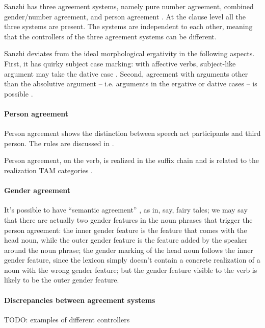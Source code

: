 \documentclass[a4paper, oneside, 12pt]{report}
\newcommand*{\citesec}[1]{\S~{#1}}
\newcommand*{\citetable}[1]{Table~{#1}}
\newcommand*{\citepage}[1]{p.~{#1}}
\begin{document}
Sanzhi has three agreement systems, 
namely pure number agreement, 
combined gender/number agreement, 
and person agreement \citep[\citepage{373}]{forker2020grammar}.
At the clause level all the three systems are present.
The systems are independent to each other, 
meaning that the controllers of the three agreement systems can be different.


Sanzhi deviates from the ideal morphological ergativity
in the following aspects.
First, it has quirky subject case marking: 
with affective verbs, subject-like argument may take the dative case 
\citep[\citetable{19.1}]{forker2020grammar}.
Second, agreement with arguments other than the absolutive argument
-- i.e. arguments in the ergative or dative cases --
is possible \citep[\citesec{20.2.4}]{forker2020grammar}.

\paragraph*{Person agreement}
Person agreement shows the distinction between speech act participants and third person.
The rules are discussed in \citep[\citesec{20.3.2}]{forker2020grammar}.

Person agreement, on the verb, is realized in the suffix chain
and is related to the realization TAM categories 
\citep[\citesec{11.4}]{forker2020grammar}.

\paragraph*{Gender agreement}

It's possible to have ``semantic agreement''
\citep[\citesec{20.2.2}]{forker2020grammar},
as in, say, fairy tales; 
we may say that there are actually two gender features in the 
noun phrases that trigger the person agreement:
the inner gender feature is the feature that comes with the head noun, 
while the outer gender feature is the feature 
added by the speaker around the noun phrase;
the gender marking of the head noun follows the inner gender feature, 
since the lexicon simply doesn't contain a concrete realization 
of a noun with the wrong gender feature;
but the gender feature visible to the verb 
is likely to be the outer gender feature. 

\paragraph*{Discrepancies between agreement systems} TODO: examples of different controllers
\end{document}
